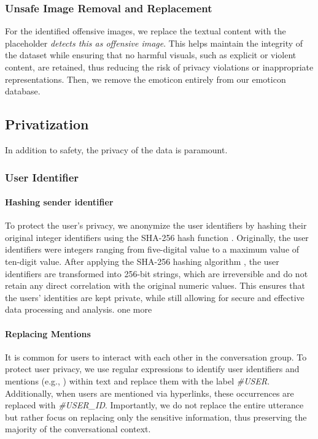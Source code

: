 \subsubsection{Unsafe Image Removal and Replacement}
For the identified offensive images, we replace the textual content with the placeholder \textit{detects this as offensive image}. This helps maintain the integrity of the dataset while ensuring that no harmful visuals, such as explicit or violent content, are retained, thus reducing the risk of privacy violations or inappropriate representations. Then, we remove the emoticon entirely from our emoticon database.

\subsection{Privatization}
In addition to safety, the privacy of the data is paramount.

\subsubsection{User Identifier}
\paragraph{Hashing sender identifier}
To protect the user's privacy, we anonymize the user identifiers by hashing their original integer identifiers using the SHA-256 hash function \cite{sha256}. Originally, the user identifiers were integers ranging from five-digital value to a maximum value of ten-digit value. After applying the SHA-256 hashing algorithm \cite{sha256}, the user identifiers are transformed into 256-bit strings, which are irreversible and do not retain any direct correlation with the original numeric values. This ensures that the users' identities are kept private, while still allowing for secure and effective data processing and analysis.
one more

\paragraph{Replacing Mentions}
It is common for users to interact with each other in the conversation group. To protect user privacy, we use regular expressions \cite{regex} to identify user identifiers and mentions (e.g., \@username) within text and replace them with the label \textit{\#USER}. Additionally, when users are mentioned via hyperlinks, these occurrences are replaced with \textit{\#USER\_ID}. Importantly, we do not replace the entire utterance but rather focus on replacing only the sensitive information, thus preserving the majority of the conversational context.

